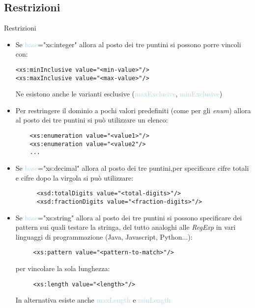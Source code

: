 \documentclass{beamer}
\begin{document}
	\subsection{Restrizioni}
	\begin{frame}[containsverbatim]{Restrizioni}
	\begin{itemize}
	\item Se \textcolor{lightblue}{base}=\textcolor{mauve}{"xs:integer"} allora al posto dei tre puntini si possono porre vincoli con:
	    \begin{lstlisting}
<xs:minInclusive value="<min-value>"/>
<xs:maxInclusive value="<max-value>"/>
	\end{lstlisting}
	Ne esistono anche le varianti esclusive (\textcolor{lightblue}{maxExclusive}, \textcolor{lightblue}{minExclusive})\bigskip
	   \item Per restringere il dominio a pochi valori predefiniti (come per gli \textit{enum}) allora al posto dei tre puntini si può utilizzare un elenco:
   \begin{lstlisting}
    <xs:enumeration value="<value1>"/>
    <xs:enumeration value="<value2"/>
    ...
	\end{lstlisting}
   \end{itemize}
   \end{frame}
   \begin{frame}[containsverbatim]
   \begin{itemize}
   \item Se  \textcolor{lightblue}{base}=\textcolor{mauve}{"xs:decimal"} allora al posto dei tre puntini,per specificare cifre totali e cifre dopo la virgola si può utilizzare:
   \begin{lstlisting}
      <xsd:totalDigits value="<total-digits>"/>
      <xsd:fractionDigits value="<fraction-digits>"/>
	\end{lstlisting}
	\item Se \textcolor{lightblue}{base}=\textcolor{mauve}{"xs:string"} allora al posto dei tre puntini si possono specificare dei pattern sui quali testare la stringa, del tutto analoghi alle \textit{RegExp} in vari linguaggi di programmazione (Java, Javascript, Python...):
	   \begin{lstlisting}
     <xs:pattern value="<pattern-to-match>"/>
	\end{lstlisting}
	per vincolare la sola lunghezza:
	  \begin{lstlisting}
     <xs:length value="<length>"/>
	\end{lstlisting}
	In alternativa esiste anche \textcolor{lightblue}{maxLength} e \textcolor{lightblue}{minLength}
   \end{itemize}
   \end{frame}
\end{document}

